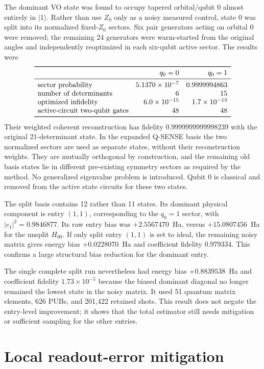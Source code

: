 \documentclass[11pt]{article}
\begin{document}
The dominant VO state was found to occupy tapered orbital/qubit 0 almost
entirely in $\lvert1\rangle$.  Rather than use $Z_0$ only as a noisy measured
control, state 0 was split into its normalized fixed-$Z_0$ sectors.  Six pair
generators acting on orbital 0 were removed; the remaining 24 generators were
warm-started from the original angles and independently reoptimized in each
six-qubit active sector.  The results were
\[
\begin{array}{lrr}
\toprule
 & q_0=0 & q_0=1\\
\midrule
\text{sector probability} & 5.1370\times10^{-7} & 0.9999994863\\
\text{number of determinants} & 6 & 15\\
\text{optimized infidelity} & 6.0\times10^{-15} & 1.7\times10^{-13}\\
\text{active-circuit two-qubit gates} & 48 & 48\\
\bottomrule
\end{array}
\]
Their weighted coherent reconstruction has fidelity
$0.9999999999998239$ with the original 21-determinant state.  In the expanded
Q-SENSE basis the two normalized sectors are used as separate states, without
their reconstruction weights.  They are mutually orthogonal by construction,
and the remaining old basis states lie in different pre-existing symmetry
sectors as required by the method.  No generalized eigenvalue problem is
introduced.  Qubit 0 is classical and removed from the active state circuits
for these two states.

The split basis contains 12 rather than 11 states.  Its dominant physical
component is entry $(1,1)$, corresponding to the $q_0=1$ sector, with
$|c_1|^2=0.9846877$.  Its raw entry bias was $+2.5567470$~Ha, versus
$+15.0807456$~Ha for the unsplit $H_{00}$.  If only split entry $(1,1)$ is
set to ideal, the remaining noisy matrix gives energy bias $+0.0228070$~Ha
and coefficient fidelity $0.979334$.  This confirms a large structural bias
reduction for the dominant entry.

The single complete split run nevertheless had energy bias $+0.8839538$~Ha
and coefficient fidelity $1.73\times10^{-5}$ because the biased dominant
diagonal no longer remained the lowest state in the noisy matrix.  It used
51 quantum matrix elements, 626 PUBs, and 201,422 retained shots.  This result
does not negate the entry-level improvement; it shows that the total estimator
still needs mitigation or sufficient sampling for the other entries.

\section{Local readout-error mitigation}
\end{document}
